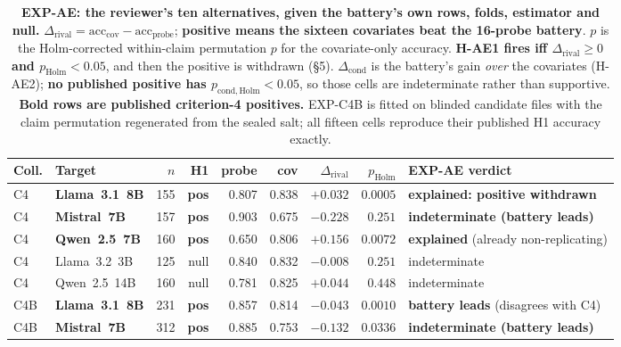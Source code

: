 \begin{table}[htbp]
\centering
\caption{\small\textbf{EXP-AE: the reviewer's ten alternatives, given the battery's own rows, folds, estimator and null.} $\Delta_{\mathrm{rival}} = \mathrm{acc}_{\mathrm{cov}} - \mathrm{acc}_{\mathrm{probe}}$; \textbf{positive means the sixteen covariates beat the 16-probe battery}. $p$ is the Holm-corrected within-claim permutation $p$ for the covariate-only accuracy. \textbf{H-AE1 fires iff $\Delta_{\mathrm{rival}}\!\ge\!0$ and $p_{\mathrm{Holm}}\!<\!0.05$}, and then the positive is withdrawn (\S5). $\Delta_{\mathrm{cond}}$ is the battery's gain \emph{over} the covariates (H-AE2); \textbf{no published positive has $p_{\mathrm{cond,Holm}}\!<\!0.05$}, so those cells are indeterminate rather than supportive. \textbf{Bold rows are published criterion-4 positives.} EXP-C4B is fitted on blinded candidate files with the claim permutation regenerated from the sealed salt; all fifteen cells reproduce their published H1 accuracy exactly.}
\label{tab:covariate_audit}
\begin{scriptsize}
\setlength{\tabcolsep}{4pt}
\begin{tabular}{@{}llrrrrrrl@{}}
\toprule
\textbf{Coll.} & \textbf{Target} & \textbf{$n$} & \textbf{H1} & \textbf{probe} & \textbf{cov} & \textbf{$\Delta_{\mathrm{rival}}$} & \textbf{$p_{\mathrm{Holm}}$} & \textbf{EXP-AE verdict} \\
\midrule
C4  & \textbf{Llama~3.1~8B}   & 155 & \textbf{pos} & 0.807 & 0.838 & $\mathbf{+0.032}$ & $\mathbf{0.0005}$ & \textbf{explained: positive withdrawn} \\
C4  & \textbf{Mistral~7B}     & 157 & \textbf{pos} & 0.903 & 0.675 & $-0.228$ & $0.251$ & \textbf{indeterminate (battery leads)} \\
C4  & \textbf{Qwen~2.5~7B}    & 160 & \textbf{pos} & 0.650 & 0.806 & $\mathbf{+0.156}$ & $\mathbf{0.0072}$ & \textbf{explained} (already non-replicating) \\
C4  & Llama~3.2~3B            & 125 & null & 0.840 & 0.832 & $-0.008$ & $0.251$ & indeterminate \\
C4  & Qwen~2.5~14B            & 160 & null & 0.781 & 0.825 & $+0.044$ & $0.448$ & indeterminate \\
\midrule
C4B & \textbf{Llama~3.1~8B}   & 231 & \textbf{pos} & 0.857 & 0.814 & $-0.043$ & $0.0010$ & \textbf{battery leads} (disagrees with C4) \\
C4B & \textbf{Mistral~7B}     & 312 & \textbf{pos} & 0.885 & 0.753 & $-0.132$ & $0.0336$ & \textbf{indeterminate (battery leads)} \\

\end{tabular}
\end{scriptsize}
\end{table}
